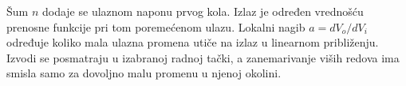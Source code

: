 Šum $n$ dodaje se ulaznom naponu prvog kola. Izlaz je određen vrednošću prenosne funkcije pri tom poremećenom ulazu. Lokalni nagib $a=dV_o/dV_i$ određuje koliko mala ulazna promena utiče na izlaz u linearnom približenju. Izvodi se posmatraju u izabranoj radnoj tački, a zanemarivanje viših redova ima smisla samo za dovoljno malu promenu u njenoj okolini.
